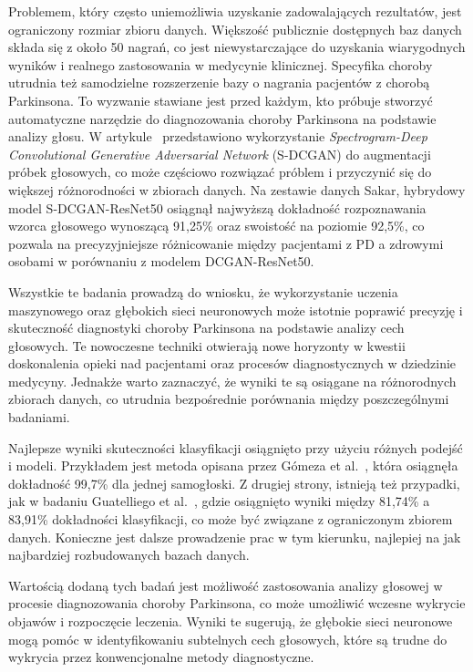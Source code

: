 Problemem, który często uniemożliwia uzyskanie zadowalających rezultatów, jest ograniczony rozmiar zbioru danych.
Większość publicznie dostępnych baz danych składa się z około 50 nagrań, co jest niewystarczające do uzyskania wiarygodnych wyników i
realnego zastosowania w medycynie klinicznej.
Specyfika choroby utrudnia też samodzielne rozszerzenie bazy o nagrania pacjentów z chorobą Parkinsona.
To wyzwanie stawiane jest przed każdym, kto próbuje stworzyć automatyczne narzędzie do diagnozowania choroby Parkinsona na podstawie analizy głosu.
W artykule~\cite{9257451} przedstawiono wykorzystanie \emph{Spectrogram-Deep Convolutional Generative Adversarial Network} (S-DCGAN) do
augmentacji próbek głosowych, co może częściowo rozwiązać próblem i przyczynić się do większej różnorodności w zbiorach danych.
Na zestawie danych Sakar, hybrydowy model S-DCGAN-ResNet50 osiągnął najwyższą dokładność rozpoznawania wzorca głosowego wynoszącą 91,25\%
oraz swoistość na poziomie 92,5\%, co pozwala na precyzyjniejsze różnicowanie między pacjentami z PD a zdrowymi osobami w porównaniu z modelem
DCGAN-ResNet50.

Wszystkie te badania prowadzą do wniosku, że wykorzystanie uczenia maszynowego oraz głębokich sieci neuronowych może istotnie poprawić precyzję
i skuteczność diagnostyki choroby Parkinsona na podstawie analizy cech głosowych.
Te nowoczesne techniki otwierają nowe horyzonty w kwestii doskonalenia opieki nad pacjentami oraz procesów diagnostycznych w dziedzinie medycyny.
Jednakże warto zaznaczyć, że wyniki te są osiągane na różnorodnych zbiorach danych, co utrudnia bezpośrednie porównania między poszczególnymi badaniami.

Najlepsze wyniki skuteczności klasyfikacji osiągnięto przy użyciu różnych podejść i modeli.
Przykładem jest metoda opisana przez Gómeza et al.~\cite{8999815}, która osiągnęła dokładność 99,7\% dla jednej samogłoski.
Z drugiej strony, istnieją też przypadki, jak w badaniu Guatelliego et al.~\cite{GUATELLI2023106700}, gdzie osiągnięto wyniki między
81,74\% a 83,91\% dokładności klasyfikacji, co może być związane z ograniczonym zbiorem danych.
Konieczne jest dalsze prowadzenie prac w tym kierunku, najlepiej na jak najbardziej rozbudowanych bazach danych.

Wartością dodaną tych badań jest możliwość zastosowania analizy głosowej w procesie diagnozowania choroby Parkinsona, co może umożliwić
wczesne wykrycie objawów i rozpoczęcie leczenia.
Wyniki te sugerują, że głębokie sieci neuronowe mogą pomóc w identyfikowaniu subtelnych cech
głosowych, które są trudne do wykrycia przez konwencjonalne metody diagnostyczne.

